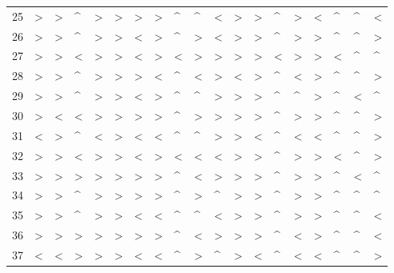 \begin{tabular}{lllllllllllllllllll}
25  &  > &  > &  \textasciicircum  &  > &  > &  > &  > &  \textasciicircum  &  \textasciicircum  &  < &  > &  > &  \textasciicircum  &  > &  < &  \textasciicircum  &  \textasciicircum  &  < \\
26  &  > &  > &  \textasciicircum  &  > &  > &  < &  > &  \textasciicircum  &  > &  < &  > &  > &  \textasciicircum  &  > &  > &  \textasciicircum  &  \textasciicircum  &  > \\
27  &  > &  > &  < &  > &  > &  < &  > &  < &  > &  > &  > &  > &  < &  > &  > &  < &  \textasciicircum  &  \textasciicircum  \\
28  &  > &  > &  \textasciicircum  &  > &  > &  > &  < &  \textasciicircum  &  < &  > &  < &  > &  \textasciicircum  &  < &  > &  \textasciicircum  &  \textasciicircum  &  > \\
29  &  > &  > &  \textasciicircum  &  > &  > &  < &  > &  \textasciicircum  &  \textasciicircum  &  > &  > &  > &  \textasciicircum  &  \textasciicircum  &  > &  \textasciicircum  &  < &  \textasciicircum  \\
30  &  > &  < &  < &  > &  > &  > &  > &  \textasciicircum  &  > &  > &  > &  > &  \textasciicircum  &  > &  > &  \textasciicircum  &  \textasciicircum  &  > \\
31  &  < &  > &  \textasciicircum  &  < &  > &  < &  < &  \textasciicircum  &  \textasciicircum  &  > &  > &  < &  \textasciicircum  &  < &  < &  \textasciicircum  &  \textasciicircum  &  > \\
32  &  > &  > &  < &  > &  > &  < &  > &  < &  < &  < &  > &  > &  \textasciicircum  &  > &  > &  < &  \textasciicircum  &  > \\
33  &  > &  > &  > &  > &  > &  > &  > &  \textasciicircum  &  < &  > &  > &  > &  \textasciicircum  &  > &  > &  \textasciicircum  &  < &  \textasciicircum  \\
34  &  > &  > &  \textasciicircum  &  > &  > &  > &  > &  \textasciicircum  &  > &  \textasciicircum  &  > &  > &  \textasciicircum  &  > &  > &  \textasciicircum  &  \textasciicircum  &  \textasciicircum  \\
35  &  > &  > &  \textasciicircum  &  > &  > &  < &  < &  \textasciicircum  &  \textasciicircum  &  < &  > &  > &  \textasciicircum  &  > &  > &  \textasciicircum  &  \textasciicircum  &  < \\
36  &  > &  > &  > &  > &  > &  > &  > &  \textasciicircum  &  < &  > &  > &  > &  \textasciicircum  &  < &  > &  \textasciicircum  &  \textasciicircum  &  < \\
37  &  < &  < &  > &  > &  > &  < &  < &  \textasciicircum  &  > &  \textasciicircum  &  > &  < &  \textasciicircum  &  < &  < &  \textasciicircum  &  \textasciicircum  &  > \\

\end{tabular}

